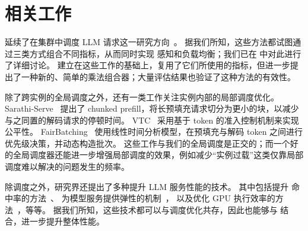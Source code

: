 \section{相关工作}
\label{sec:related}

{\sys} 延续了在集群中调度 LLM 请求这一研究方向~\cite{vllm,DBLP:journals/corr/abs-2506-05871,DBLP:conf/iclr/SrivatsaHAL025,
305212,DBLP:journals/corr/abs-2507-17769,llm-d}。
据我们所知，这些方法都试图通过三类方式组合不同指标，从而同时实现 {\kvcache} 感知和负载均衡；我们已在 \textsection{\ref{sec:principles}} 中对此进行了详细讨论。
{\sys} 建立在这些工作的基础上，复用了它们所使用的指标，但进一步提出了一种新的、简单的乘法组合器；大量评估结果也验证了这种方法的有效性。

除了跨实例的全局调度之外，还有一类工作关注实例内部的局部调度优化。
Sarathi-Serve~\cite{298679} 提出了 chunked prefill，将长预填充请求切分为更小的块，以减少与之同置的解码请求的停顿时间。
VTC~\cite{DBLP:conf/osdi/0007CLZ0ZGS24} 采用基于 token 的准入控制机制来实现公平性。
FairBatching~\cite{DBLP:journals/corr/abs-2510-14392} 使用线性时间分析模型，在预填充与解码 token 之间进行优先级决策，并动态构造批次。
这些工作与我们的全局调度是正交的；而一个好的全局调度器还能进一步增强局部调度的效果，例如减少“实例过载”这类仅靠局部调度难以解决的问题发生的频率。

除调度之外，研究界还提出了多种提升 LLM 服务性能的技术。
其中包括提升 {\kvcache} 命中率的方法~\cite{305212,10.5555/3768039.3768067}、
为模型服务提供弹性的机制~\cite{DBLP:conf/osdi/ZhangWLWS0025,DBLP:conf/sosp/Xiang0QYZYZL0025}，
以及优化 GPU 执行效率的方法~\cite{vllm,DBLP:conf/asplos/KamathPM0RP25}，等等。
据我们所知，这些技术都可以与调度优化共存，因此也能够与 {\sys} 结合，进一步提升整体性能。
